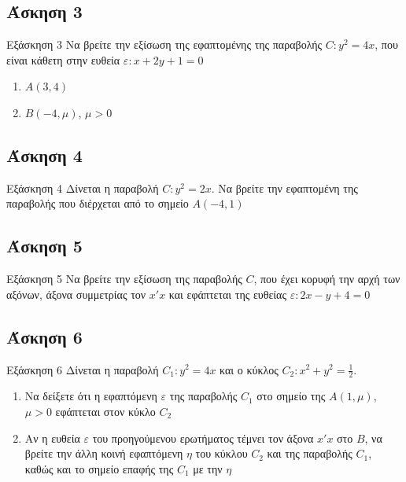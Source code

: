 \documentclass[greek]{beamer}
\begin{document}
\subsection{Άσκηση 3}
\begin{frame}[label=Άσκηση3,t]{Εξάσκηση 3}
 Να βρείτε την εξίσωση της εφαπτομένης της παραβολής $C:y^2=4x$, που είναι κάθετη στην ευθεία $ε:x+2y+1=0$
 \begin{enumerate}
  \item<1-> $Α(3,4)$
  \item<2-> $Β(-4,μ)$, $μ>0$
 \end{enumerate}

\end{frame}

\subsection{Άσκηση 4}
\begin{frame}[label=Άσκηση4,t]{Εξάσκηση 4}
 Δίνεται η παραβολή $C:y^2=2x$. Να βρείτε την εφαπτομένη της παραβολής που διέρχεται από το σημείο $Α(-4,1)$

\end{frame}

\subsection{Άσκηση 5}
\begin{frame}[label=Άσκηση5,t]{Εξάσκηση 5}
 Να βρείτε την εξίσωση της παραβολής $C$, που έχει κορυφή την αρχή των αξόνων, άξονα συμμετρίας τον $x'x$ και εφάπτεται της ευθείας $ε:2x-y+4=0$

\end{frame}

\subsection{Άσκηση 6}
\begin{frame}[label=Άσκηση6,t]{Εξάσκηση 6}
 Δίνεται η παραβολή $C_1:y^2=4x$ και ο κύκλος $C_2:x^2+y^2=\frac{1}{2}$.
 \begin{enumerate}
  \item<1-> Να δείξετε ότι η εφαπτόμενη $ε$ της παραβολής $C_1$ στο σημείο της $Α(1,μ)$, $μ>0$ εφάπτεται στον κύκλο $C_2$
  \item<2-> Αν η ευθεία $ε$ του προηγούμενου ερωτήματος τέμνει τον άξονα $x'x$ στο $Β$, να βρείτε την άλλη κοινή εφαπτόμενη $η$ του κύκλου $C_2$ και της παραβολής $C_1$, καθώς και το σημείο επαφής της $C_1$ με την $η$
 \end{enumerate}

\end{frame}
\end{document}
